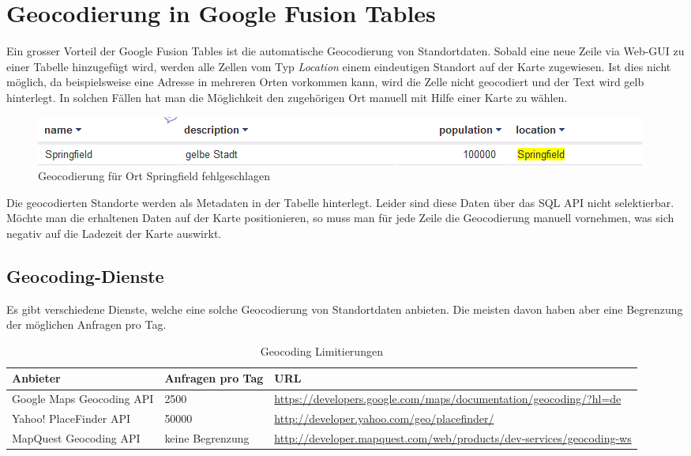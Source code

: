 \section{Geocodierung in Google Fusion Tables}
\label{gft-geocoding}
Ein grosser Vorteil der Google Fusion Tables ist die automatische 
\gls{Geocodierung} von Standortdaten. Sobald eine neue Zeile via Web-GUI zu einer Tabelle hinzugefügt wird, werden alle Zellen vom Typ \emph{Location} einem eindeutigen Standort auf der Karte zugewiesen. Ist dies nicht möglich, da beispielsweise eine Adresse in mehreren Orten vorkommen kann, wird die Zelle nicht geocodiert und der Text wird gelb hinterlegt. In solchen Fällen hat man die Möglichkeit den zugehörigen Ort manuell mit Hilfe einer Karte zu wählen.

\begin{figure}[!ht]
	\centering
	\includegraphics[width=\textwidth]{images/einfuehrung/geocoding_failed}
	\caption{Geocodierung für Ort Springfield fehlgeschlagen}
	\label{geocoding_failed}
\end{figure}

Die geocodierten Standorte werden als Metadaten in der Tabelle hinterlegt. Leider sind diese Daten über das SQL \gls{API} nicht selektierbar. Möchte man die erhaltenen Daten auf der Karte positionieren, so muss man für jede Zeile die \gls{Geocodierung} manuell vornehmen, was sich negativ auf die Ladezeit der Karte auswirkt.

\subsection{Geocoding-Dienste}
Es gibt verschiedene Dienste, welche eine solche \gls{Geocodierung} von Standortdaten anbieten. Die meisten davon haben aber eine Begrenzung der möglichen Anfragen pro Tag.

\begin{table}[H]
\centering
\begin{tabular}{|p{0.4\threecelltabwidth}|p{0.14\threecelltabwidth}|p{0.46\threecelltabwidth}|}
\hline 
\textbf{Anbieter} & \textbf{Anfragen pro Tag} & \textbf{URL} \\ 
\hline 
Google Maps Geocoding \gls{API} & 2500 & \url{https://developers.google.com/maps/documentation/geocoding/?hl=de} \\ 
\hline 
Yahoo! PlaceFinder \gls{API} & 50000 & \url{http://developer.yahoo.com/geo/placefinder/} \\ 
\hline 
MapQuest Geocoding \gls{API} & keine Begrenzung & \url{http://developer.mapquest.com/web/products/dev-services/geocoding-ws} \\ 
\hline 
\end{tabular}
\caption{Geocoding Limitierungen}
\end{table} 

